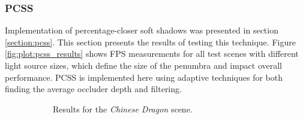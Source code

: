 \subsubsection{PCSS}
Implementation of percentage-closer soft shadows was presented in section \ref{section:pcss}. This section presents the results of testing this technique. Figure \ref{fig:plot:pcss_results} shows FPS measurements for all test scenes with different light source sizes, which define the size of the penumbra and impact overall performance. PCSS is implemented here using adaptive techniques for both finding the average occluder depth and filtering.

\begin{figure}[h]
    \centering
    \begin{subfigure}[t]{0.48\textwidth}
        \caption{Results for the \textit{Chinese Dragon} scene.}
        \label{fig:plot:pcss_dragon}
    \end{subfigure}
    \hfill
    \begin{subfigure}[t]{0.48\textwidth}

\end{subfigure}
\end{figure}
